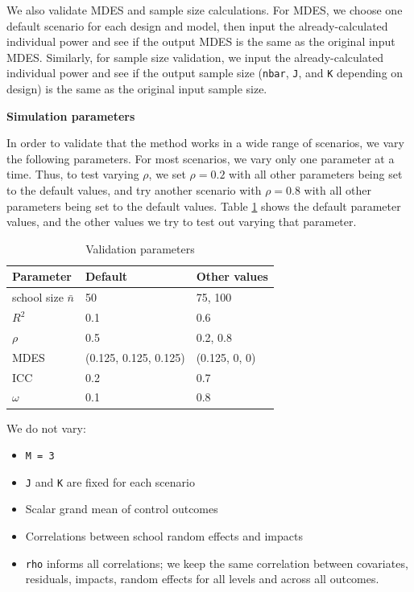 \documentclass{article}
\providecommand{\tightlist}{%
  \setlength{\itemsep}{0pt}\setlength{\parskip}{0pt}}
\begin{document}
We also validate MDES and sample size calculations. For MDES, we choose
one default scenario for each design and model, then input the
already-calculated individual power and see if the output MDES is the
same as the original input MDES. Similarly, for sample size validation,
we input the already-calculated individual power and see if the output
sample size (\texttt{nbar}, \texttt{J}, and \texttt{K} depending on
design) is the same as the original input sample size.

\textbf{Simulation parameters}

In order to validate that the method works in a wide range of scenarios,
we vary the following parameters. For most scenarios, we vary only one
parameter at a time. Thus, to test varying \(\rho\), we set
\(\rho = 0.2\) with all other parameters being set to the default
values, and try another scenario with \(\rho = 0.8\) with all other
parameters being set to the default values. Table \ref{tab:val_params}
shows the default parameter values, and the other values we try to test
out varying that parameter.

\begin{table}
\centering
\begin{tabular}{l l l}
\toprule
Parameter               & Default                & Other values \\ \midrule
school size $\bar{n}$   & 50                     & 75, 100           \\
$R^2$                   & 0.1                    & 0.6               \\
$\rho$                  & 0.5                    & 0.2, 0.8          \\
MDES                    & (0.125, 0.125, 0.125)  & (0.125, 0, 0)     \\
ICC                     & 0.2                    & 0.7               \\
$\omega$                & 0.1                    & 0.8               \\
\bottomrule
\end{tabular}
\label{tab:val_params}
\caption{Validation parameters}
\end{table}

We do not vary:

\begin{itemize}
\tightlist
\item
  \texttt{M\ =\ 3}
\item
  \texttt{J} and \texttt{K} are fixed for each scenario
\item
  Scalar grand mean of control outcomes
\item
  Correlations between school random effects and impacts
\item
  \texttt{rho} informs all correlations; we keep the same correlation
  between covariates, residuals, impacts, random effects for all levels
  and across all outcomes.
\end{itemize}
\end{document}
